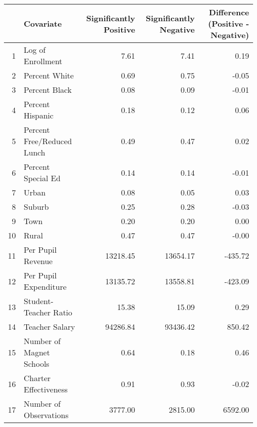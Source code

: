 \begin{tabular}{rlrrr}
  \hline
 & Covariate & Significantly Positive & Significantly Negative & Difference (Positive - Negative) \\ 
  \hline
1 & Log of Enrollment & 7.61 & 7.41 & 0.19 \\ 
  2 & Percent White & 0.69 & 0.75 & -0.05 \\ 
  3 & Percent Black & 0.08 & 0.09 & -0.01 \\ 
  4 & Percent Hispanic & 0.18 & 0.12 & 0.06 \\ 
  5 & Percent Free/Reduced Lunch & 0.49 & 0.47 & 0.02 \\ 
  6 & Percent Special Ed & 0.14 & 0.14 & -0.01 \\ 
  7 & Urban & 0.08 & 0.05 & 0.03 \\ 
  8 & Suburb & 0.25 & 0.28 & -0.03 \\ 
  9 & Town & 0.20 & 0.20 & 0.00 \\ 
  10 & Rural & 0.47 & 0.47 & -0.00 \\ 
  11 & Per Pupil Revenue & 13218.45 & 13654.17 & -435.72 \\ 
  12 & Per Pupil Expenditure & 13135.72 & 13558.81 & -423.09 \\ 
  13 & Student-Teacher Ratio & 15.38 & 15.09 & 0.29 \\ 
  14 & Teacher Salary & 94286.84 & 93436.42 & 850.42 \\ 
  15 & Number of Magnet Schools & 0.64 & 0.18 & 0.46 \\ 
  16 & Charter Effectiveness & 0.91 & 0.93 & -0.02 \\ 
  17 & Number of Observations & 3777.00 & 2815.00 & 6592.00 \\ 
   \hline
\end{tabular}

